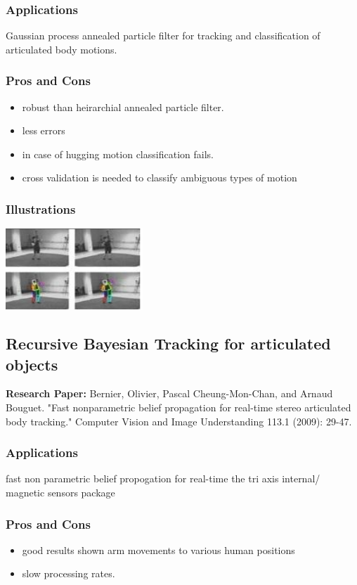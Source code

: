 \documentclass[a4paper,10pt]{report}
\begin{document}
\subsubsection{Applications}
Gaussian process annealed particle filter for tracking and classification of articulated body motions.
\subsubsection{Pros and Cons}
\begin{itemize}
 \item robust than heirarchial annealed particle filter.
 \item less errors
 \item in case of hugging motion classification fails.
 \item cross validation is needed to classify ambiguous types of motion
\end{itemize}
\subsubsection{Illustrations}\newline\newline
\includegraphics{./skeltrack5.png}
\newline \newline

\subsection{Recursive Bayesian Tracking for articulated objects}
\textbf{Research Paper:} Bernier, Olivier, Pascal Cheung-Mon-Chan, and Arnaud Bouguet. "Fast nonparametric belief propagation for real-time stereo articulated body tracking." Computer Vision and Image Understanding 113.1 (2009): 29-47.
\subsubsection{Applications}
fast non parametric belief propogation for real-time the tri axis internal/ magnetic sensors package
\subsubsection{Pros and Cons}
\begin{itemize}
 \item good results shown arm movements to various human positions
 \item slow processing rates.
\end{itemize}
\end{document}
